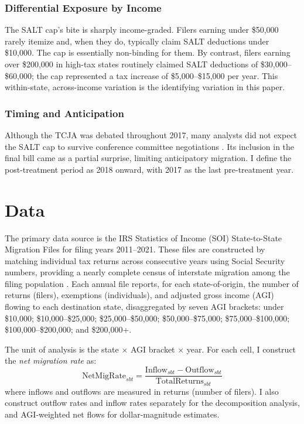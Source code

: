 \documentclass[12pt]{article}
\begin{document}
\subsubsection*{Differential Exposure by Income} The SALT cap's bite is sharply income-graded. Filers earning under \$50,000 rarely itemize and, when they do, typically claim SALT deductions under \$10,000. The cap is essentially non-binding for them. By contrast, filers earning over \$200,000 in high-tax states routinely claimed SALT deductions of \$30,000--\$60,000; the cap represented a tax increase of \$5,000--\$15,000 per year. This within-state, across-income variation is the identifying variation in this paper.

\subsubsection*{Timing and Anticipation} Although the TCJA was debated throughout 2017, many analysts did not expect the SALT cap to survive conference committee negotiations \citep{nyt2017}. Its inclusion in the final bill came as a partial surprise, limiting anticipatory migration. I define the post-treatment period as 2018 onward, with 2017 as the last pre-treatment year.


\section{Data}

The primary data source is the IRS Statistics of Income (SOI) State-to-State Migration Files for filing years 2011--2021. These files are constructed by matching individual tax returns across consecutive years using Social Security numbers, providing a nearly complete census of interstate migration among the filing population \citep{irssoi2023}. Each annual file reports, for each state-of-origin, the number of returns (filers), exemptions (individuals), and adjusted gross income (AGI) flowing to each destination state, disaggregated by seven AGI brackets: under \$10,000; \$10,000--\$25,000; \$25,000--\$50,000; \$50,000--\$75,000; \$75,000--\$100,000; \$100,000--\$200,000; and \$200,000+.

The unit of analysis is the state $\times$ AGI bracket $\times$ year. For each cell, I construct the \textit{net migration rate} as:
\begin{equation}
\text{NetMigRate}_{sbt} = \frac{\text{Inflow}_{sbt} - \text{Outflow}_{sbt}}{\text{TotalReturns}_{sbt}}
\end{equation}
where inflows and outflows are measured in returns (number of filers). I also construct outflow rates and inflow rates separately for the decomposition analysis, and AGI-weighted net flows for dollar-magnitude estimates.
\end{document}
